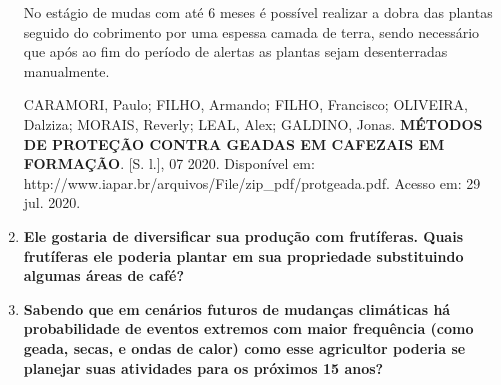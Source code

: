 \documentclass[a4paper, 12pt, brazilian]{article}
\begin{document}
\begin{enumerate}
		No estágio de mudas com até 6 meses é possível realizar a dobra das plantas seguido do cobrimento por uma espessa camada de terra, sendo necessário que após ao fim do período de alertas as plantas sejam desenterradas manualmente.
		
		CARAMORI, Paulo; FILHO, Armando; FILHO, Francisco; OLIVEIRA, Dalziza; MORAIS, Reverly; LEAL, Alex; GALDINO, Jonas. \textbf{MÉTODOS DE PROTEÇÃO CONTRA GEADAS EM CAFEZAIS EM FORMAÇÃO}. [S. l.], 07 2020. Disponível em: http://www.iapar.br/arquivos/File/zip\_pdf/protgeada.pdf. Acesso em: 29 jul. 2020.
		
		\item\textbf{Ele gostaria de diversificar sua produção com frutíferas. Quais frutíferas ele poderia plantar em sua propriedade substituindo algumas áreas de café?}
		
		\item\textbf{Sabendo que em cenários futuros de mudanças climáticas há probabilidade de eventos extremos com maior frequência (como geada, secas, e ondas de calor) como esse agricultor poderia se planejar suas atividades para os próximos 15 anos?}
	\end{enumerate}
\end{document}
